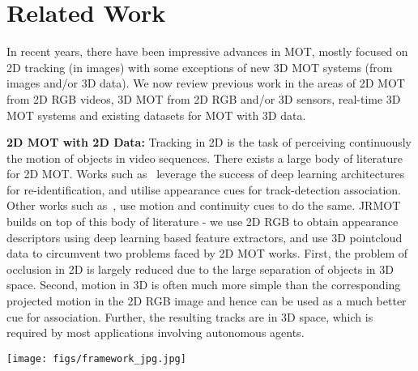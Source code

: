 \documentclass[letterpaper, 10 pt, conference]{ieeeconf}
\newcommand{\methodname}{{JRMOT}\xspace}
\begin{document}
%
 \section{Related Work} 
\label{s:RW}

In recent years, there have been impressive advances in MOT, mostly focused on 2D tracking (in images) with some exceptions of new 3D MOT systems (from images and/or 3D data).
We now review previous work in the areas of 2D MOT from 2D RGB videos, 3D MOT from 2D RGB and/or 3D sensors, real-time 3D MOT systems and existing datasets for MOT with 3D data.




\textbf{2D MOT with 2D Data:}
Tracking in 2D is the task of perceiving continuously the motion of objects in video sequences. 
There exists a large body of literature for 2D MOT. Works such as~\cite{bergmann2019tracking, feng2019multi, sun2019deep, yoon2019online} leverage the success of deep learning architectures for re-identification, and utilise appearance cues for track-detection association. Other works such as~\cite{wang2019exploit,rezatofighiiccv2015}, use motion and continuity cues to do the same. 
\methodname builds on top of this body of literature - we use 2D RGB to obtain appearance descriptors using deep learning based feature extractors, and use 3D pointcloud data to circumvent two problems faced by 2D MOT works. First, the problem of occlusion in 2D is largely reduced due to the large separation of objects in 3D space. Second, motion in 3D is often much more simple than the corresponding projected motion in the 2D RGB image and hence can be used as a much better cue for association. Further, the resulting tracks are in 3D space, which is required by most applications involving autonomous agents.



\begin{figure*}[th!]
    \centering
    \texttt{[image: figs/framework\_jpg.jpg]}
    \caption{\methodname: Our proposed 3D MOT system is composed of a Detection block, that includes the 2D detector (Sec~\ref{ss:2Ddetection}), 2D appearance model (Sec~\ref{ss:appmod}), 3D detection and feature extractor (Sec~\ref{ss:3Ddetections}), and a Tracking block containing data association (Sec ~\ref{ss:ff} and Sec~\ref{ss:da}) and filtering (Sec~\ref{ss:filtering}) and track management (Sec~\ref{ss:track_manage}) components;  refer to tracks, detections, features respectively with the superscript indicating the space; The system integrates information from 2D RGB images and 3D pointclouds into a single 3D multi-object recursive estimation tracker with real-time performance}
    \label{fig:framework}
\end{figure*}
\end{document}

